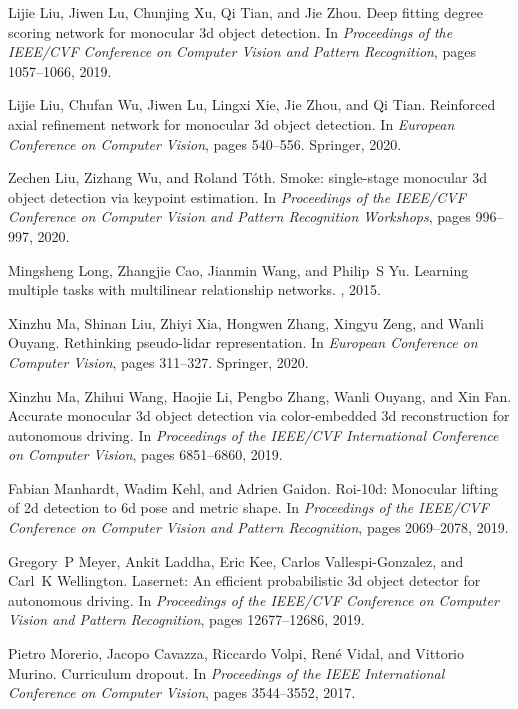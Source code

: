 \documentclass[10pt,twocolumn,letterpaper]{article}
\begin{document}
{\begin{thebibliography}{10}
Lijie Liu, Jiwen Lu, Chunjing Xu, Qi Tian, and Jie Zhou.
\newblock Deep fitting degree scoring network for monocular 3d object
  detection.
\newblock In {\em Proceedings of the IEEE/CVF Conference on Computer Vision and
  Pattern Recognition}, pages 1057--1066, 2019.

Lijie Liu, Chufan Wu, Jiwen Lu, Lingxi Xie, Jie Zhou, and Qi Tian.
\newblock Reinforced axial refinement network for monocular 3d object
  detection.
\newblock In {\em European Conference on Computer Vision}, pages 540--556.
  Springer, 2020.

Zechen Liu, Zizhang Wu, and Roland T{\'o}th.
\newblock Smoke: single-stage monocular 3d object detection via keypoint
  estimation.
\newblock In {\em Proceedings of the IEEE/CVF Conference on Computer Vision and
  Pattern Recognition Workshops}, pages 996--997, 2020.

Mingsheng Long, Zhangjie Cao, Jianmin Wang, and Philip~S Yu.
\newblock Learning multiple tasks with multilinear relationship networks.
, 2015.

Xinzhu Ma, Shinan Liu, Zhiyi Xia, Hongwen Zhang, Xingyu Zeng, and Wanli Ouyang.
\newblock Rethinking pseudo-lidar representation.
\newblock In {\em European Conference on Computer Vision}, pages 311--327.
  Springer, 2020.

Xinzhu Ma, Zhihui Wang, Haojie Li, Pengbo Zhang, Wanli Ouyang, and Xin Fan.
\newblock Accurate monocular 3d object detection via color-embedded 3d
  reconstruction for autonomous driving.
\newblock In {\em Proceedings of the IEEE/CVF International Conference on
  Computer Vision}, pages 6851--6860, 2019.

Fabian Manhardt, Wadim Kehl, and Adrien Gaidon.
\newblock Roi-10d: Monocular lifting of 2d detection to 6d pose and metric
  shape.
\newblock In {\em Proceedings of the IEEE/CVF Conference on Computer Vision and
  Pattern Recognition}, pages 2069--2078, 2019.

Gregory~P Meyer, Ankit Laddha, Eric Kee, Carlos Vallespi-Gonzalez, and Carl~K
  Wellington.
\newblock Lasernet: An efficient probabilistic 3d object detector for
  autonomous driving.
\newblock In {\em Proceedings of the IEEE/CVF Conference on Computer Vision and
  Pattern Recognition}, pages 12677--12686, 2019.

Pietro Morerio, Jacopo Cavazza, Riccardo Volpi, Ren{\'e} Vidal, and Vittorio
  Murino.
\newblock Curriculum dropout.
\newblock In {\em Proceedings of the IEEE International Conference on Computer
  Vision}, pages 3544--3552, 2017.


\end{thebibliography}}
\end{document}
